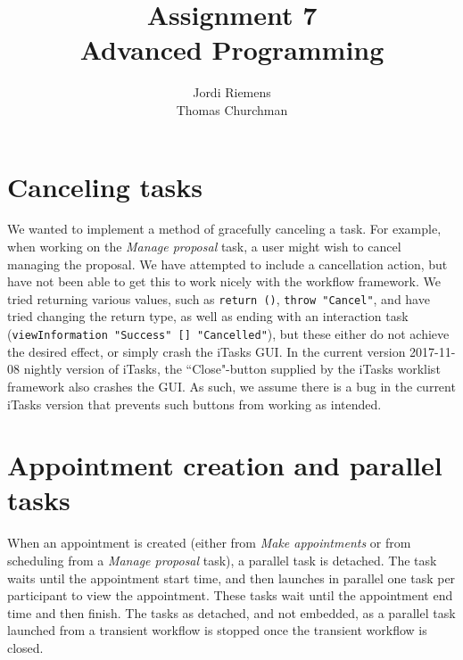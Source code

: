 \documentclass{article}
\title{Assignment 7\\\normalsize{Advanced Programming}}
\author{Jordi Riemens\\Thomas Churchman}
\begin{document}
	\maketitle
	
	\section{Canceling tasks}
	We wanted to implement a method of gracefully canceling a task.
	For example, when working on the \emph{Manage proposal} task, a user might wish to cancel managing the proposal.
	We have attempted to include a cancellation action, but have not been able to get this to work nicely with the workflow framework.
	We tried returning various values, such as \lstinline|return ()|, \lstinline|throw "Cancel"|, and have tried changing the return type, as well as ending with an interaction task (\lstinline|viewInformation "Success" [] "Cancelled"|), but these either do not achieve the desired effect, or simply crash the iTasks GUI.
	In the current version 2017-11-08 nightly version of iTasks, the ``Close"-button supplied by the iTasks worklist framework also crashes the GUI.
	As such, we assume there is a bug in the current iTasks version that prevents such buttons from working as intended.
	
	\section{Appointment creation and parallel tasks}
	When an appointment is created (either from \emph{Make appointments} or from scheduling from a \emph{Manage proposal} task), a parallel task is detached.
	The task waits until the appointment start time, and then launches in parallel one task per participant to view the appointment.
	These tasks wait until the appointment end time and then finish.
	The tasks as detached, and not embedded, as a parallel task launched from a transient workflow is stopped once the transient workflow is closed.
	
\end{document}
